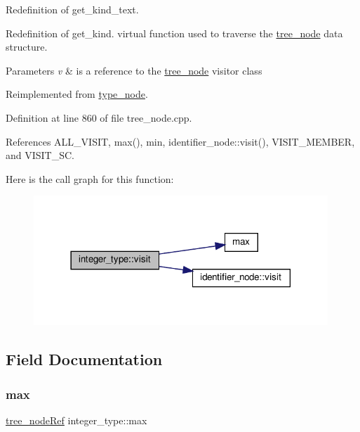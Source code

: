 Redefinition of get\+\_\+kind\+\_\+text. 

Redefinition of get\+\_\+kind. virtual function used to traverse the \hyperlink{classtree__node}{tree\+\_\+node} data structure. 
\begin{DoxyParams}{Parameters}
{\em v} & is a reference to the \hyperlink{classtree__node}{tree\+\_\+node} visitor class \\
\hline
\end{DoxyParams}


Reimplemented from \hyperlink{structtype__node_adc6e447af5f9505e6305320933c46a96}{type\+\_\+node}.



Definition at line 860 of file tree\+\_\+node.\+cpp.



References A\+L\+L\+\_\+\+V\+I\+S\+IT, max(), min, identifier\+\_\+node\+::visit(), V\+I\+S\+I\+T\+\_\+\+M\+E\+M\+B\+ER, and V\+I\+S\+I\+T\+\_\+\+SC.

Here is the call graph for this function\+:
\nopagebreak
\begin{figure}[H]
\begin{center}
\leavevmode
\includegraphics[width=314pt]{d7/d46/structinteger__type_af6ef21cdf33588b79656e930c2444987_cgraph}
\end{center}
\end{figure}


\subsection{Field Documentation}
\mbox{\label{structinteger__type_a85713610c9a1ff37771373ed2faf0e0a}} 
\subsubsection{\texorpdfstring{max}{max}}
{\footnotesize\ttfamily \hyperlink{tree__node_8hpp_a6ee377554d1c4871ad66a337eaa67fd5}{tree\+\_\+node\+Ref} integer\+\_\+type\+::max}



